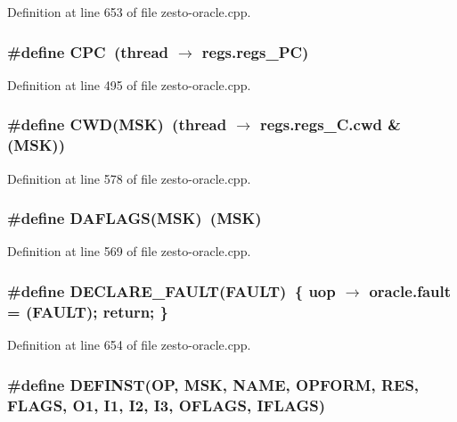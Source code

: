 Definition at line 653 of file zesto-oracle.cpp.
\subsubsection[{CPC}]{\setlength{\rightskip}{0pt plus 5cm}\#define CPC~(thread $\rightarrow$ regs.regs\_\-PC)}\label{zesto-oracle_8cpp_47928f393a8ffdecfa07271f22beb34b}




Definition at line 495 of file zesto-oracle.cpp.
\subsubsection[{CWD}]{\setlength{\rightskip}{0pt plus 5cm}\#define CWD(MSK)~(thread $\rightarrow$ regs.regs\_\-C.cwd \& (MSK))}\label{zesto-oracle_8cpp_9fbb923f79e2e5cdd6c74c94705b21cb}




Definition at line 578 of file zesto-oracle.cpp.
\subsubsection[{DAFLAGS}]{\setlength{\rightskip}{0pt plus 5cm}\#define DAFLAGS(MSK)~(MSK)}\label{zesto-oracle_8cpp_ae73cec06b7c25168fc7f1e419d980c4}




Definition at line 569 of file zesto-oracle.cpp.
\subsubsection[{DECLARE\_\-FAULT}]{\setlength{\rightskip}{0pt plus 5cm}\#define DECLARE\_\-FAULT(FAULT)~\{ uop $\rightarrow$ oracle.fault = (FAULT); return; \}}\label{zesto-oracle_8cpp_598ae1e60cce3e06a2f531d8a3de36a1}




Definition at line 654 of file zesto-oracle.cpp.
\subsubsection[{DEFINST}]{\setlength{\rightskip}{0pt plus 5cm}\#define DEFINST(OP, \/  MSK, \/  NAME, \/  OPFORM, \/  RES, \/  FLAGS, \/  O1, \/  I1, \/  I2, \/  I3, \/  OFLAGS, \/  IFLAGS)}\label{zesto-oracle_8cpp_0d06a1978d25d25a08e7365790bb9cea}


